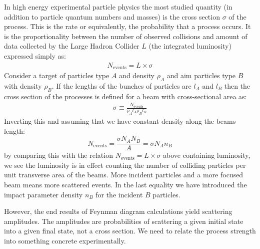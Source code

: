 In high energy experimental particle physics the most studied quantity (in addition to particle quantum numbers and masses) is the
cross section $\sigma$ of the process. This is the rate or equivalently, the probability that a process occurs. 
It is the proportionality between the number of observed collisions and amount of data collected by the Large Hadron Collider
 $L$ (the integrated luminosity) expressed simply as:
\begin{align*}
N_{\textrm{events}} = L \times \sigma
\end{align*}
Consider a target of particles type $A$ and density $\rho_A$ and aim particles type 
$B$ with density $\rho_B$. If the lengths of the bunches of particles are $l_A$ and $l_B$ 
then the cross section of the processes is defined for a beam with cross-sectional area as:
\begin{align*}
\sigma \equiv \frac{N_{\textrm{events}}}{\rho_A l_A \rho_B l_B}
\end{align*}
Inverting this and assuming that we have constant density along the beams length:
\begin{equation}\label{eq:sigma}
N_{\textrm{events}} = \frac{\sigma N_A N_B}{A} = \sigma{N_A n_B}
\end{equation}
by comparing this with the relation $N_{\textrm{events}} = L \times \sigma$ above containing luminosity, we see the
 luminosity is in effect counting the number of colliding particles per unit transverse area of the beams.
 More incident particles and a more focused beam means more scattered events. 
In the last equality we have introduced the impact parameter density $n_B$ for
 the incident $B$ particles.

However, the end results of Feynman diagram calculations yield scattering amplitudes.
The amplitudes are probabilities of scattering a given initial state into a given final state, not
a cross section. We  need to relate the process strength  into
something concrete experimentally.
 
